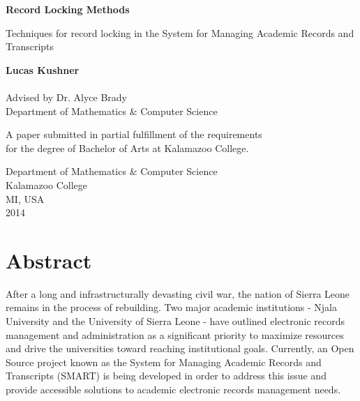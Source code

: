 \documentclass[12pt]{article}
\begin{document}
\begin{titlepage}
    \begin{center}
        \vspace*{1cm}
        \Huge
        \textbf{Record Locking Methods}

        \vspace{0.5cm}
        \Large
        Techniques for record locking in the System for Managing Academic Records and Transcripts

        \vspace{1.5cm}
        \normalsize
        \textbf{Lucas Kushner}\\
         \\
        Advised by Dr. Alyce Brady \\Department of Mathematics \& Computer Science

        \vfill
        A paper submitted in partial fulfillment of the requirements \\for the degree of Bachelor of Arts at Kalamazoo College.

        \vspace{0.8cm}
        Department of Mathematics \& Computer Science\\
        Kalamazoo College\\
        MI, USA\\
        2014
    \end{center}
    \thispagestyle{empty}
\end{titlepage}

\newpage\null\thispagestyle{empty}\newpage

\doublespace

\section*{Abstract}
After a long and infrastructurally devasting civil war, the nation of Sierra Leone remains in the process of rebuilding. Two major academic institutions - Njala University and the University of Sierra Leone - have outlined electronic records management and administration as a significant priority to maximize resources and drive the universities toward reaching institutional goals. Currently, an Open Source project known as the System for Managing Academic Records and Transcripts (SMART) is being developed in order to address this issue and provide accessible solutions to academic electronic records management needs.
\end{document}
